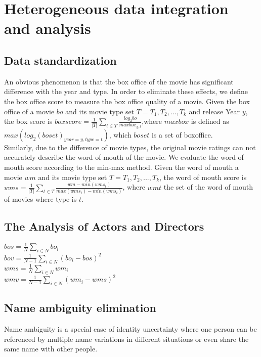\section{Heterogeneous data integration and analysis}
\label{sec:analyse}
\subsection{Data standardization}
An obvious phenomenon is that the box office of the movie has significant difference with the year and type. In order to eliminate these effects, we define the box office score to measure the box office quality of a movie. Given the box office of a movie $bo$ and its movie type set $T = {T_1,T_2,...,T_k}$ and release Year $y$, the box score is $boxscore=\frac{1}{|T|}\sum_{t\in T}\frac{log_2bo}{maxbox_{y,t}}$,where $maxbox$ is defined as $max(log_2(boset)_{year=y,type=t})$, which $boset$ is a set of boxoffice.\\
Similarly, due to the difference of movie types, the original movie ratings can not accurately describe the word of mouth of the movie. We evaluate the word of mouth score according to the min-max method. Given the word of mouth a movie $wm$ and its movie type set $T = {T_1,T_2,...,T_k}$, the word of mouth score is $wms=\frac{1}{|T|}\sum_{t\in T}\frac{wm-min(wms_t)}{max(wms_t)-min(wms_t)}$, where $wmt$ the set of the word of mouth of movies where type is $t$.
\subsection{The Analysis of Actors and Directors}
$bos =  \frac{1}{N}\sum_{i\in N}bo_i$\\
$bov = \frac{1}{N-1}\sum_{i\in N}(bo_i-bos)^2$\\
$wms =  \frac{1}{N}\sum_{i\in N}wm_i$\\
$wmv = \frac{1}{N-1}\sum_{i\in N}(wm_i-wms)^2$\\
\subsection{Name ambiguity elimination}
Name ambiguity is a special case of identity uncertainty where one person can be referenced by multiple name variations in different situations or even share the same name with other people.

